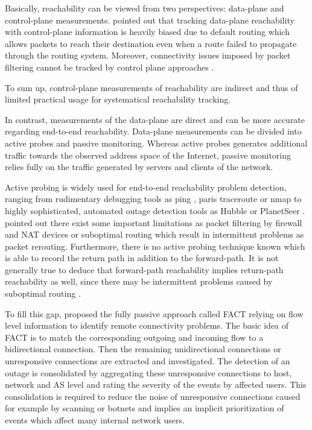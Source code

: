 \documentclass{sigcomm-alternate}
\begin{document}
Basically, reachability can be viewed from two perspectives: data-plane
and control-plane measurements. \cite{Bush:Optometry} pointed out
that tracking data-plane reachability with control-plane information is
heavily biased due to default routing which allows packets to reach their
destination even when a route failed to propagate through the routing
system. Moreover, connectivity issues imposed by packet filtering cannot
be tracked by control plane approaches \cite{Dainotti:2011:ACI}.

To sum up, control-plane measurements of reachability are indirect and
thus of limited practical usage for systematical reachability tracking.

In contrast, measurements of the data-plane are direct and can be more
accurate regarding end-to-end reachability. Data-plane measurements can
be divided into active probes and passive monitoring. Whereas active
probes generates additional traffic towards the observed address space
of the Internet, passive monitoring relies fully on the traffic generated
by servers and clients of the network.

Active probing is widely used for end-to-end reachability problem
detection, ranging from rudimentary debugging tools as ping \cite{PING},
paris traceroute \cite{traceroute} or nmap \cite{Nmap} to highly
sophisticated, automated outage detection tools as Hubble \cite{Katz:2008}
or PlanetSeer \cite{Zhang:2004}. \cite{Bush:Optometry} pointed out
there exist some important limitations as packet filtering by firewall
and NAT devices or suboptimal routing which result in intermittent
problems as packet rerouting. Furthermore, there is no active probing
technique known which is able to record the return path in addition to
the forward-path. It is not generally true to deduce that forward-path
reachability implies return-path reachability as well, since there may be
intermittent problems caused by suboptimal routing \cite{Bush:Optometry}.

To fill this gap, \cite{SchatzmannPAM2011} proposed the fully
passive approach called FACT relying on flow level information to
identify remote connectivity problems. The basic idea of FACT is to
match the corresponding outgoing and incoming flow to a bidirectional
connection. Then the remaining unidirectional connections or unresponsive
connections are extracted and investigated. The detection of an outage
is consolidated by aggregating these unresponsive connections to host,
network and AS level and rating the severity of the events by affected
users. This consolidation is required to reduce the noise of unresponsive
connections caused for example by scanning or botnets and implies an
implicit prioritization of events which affect many internal network
users.
\end{document}
